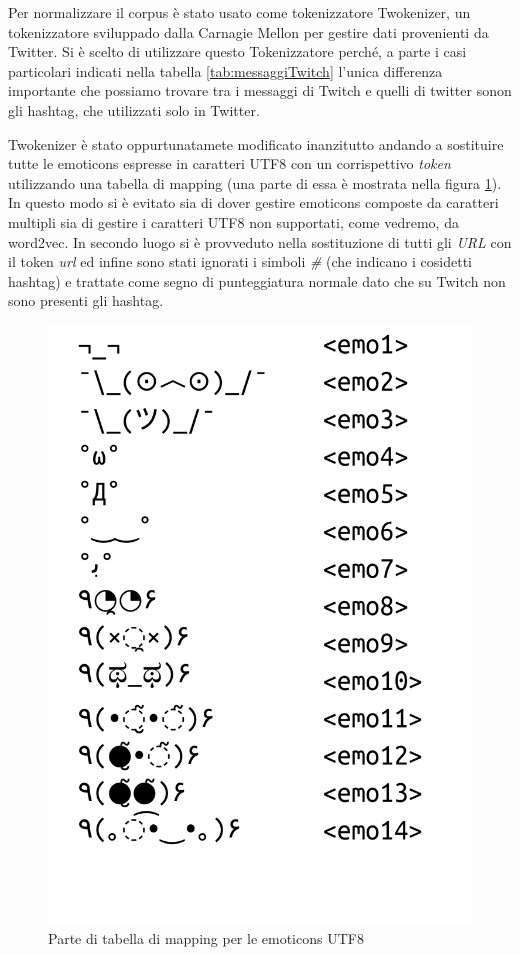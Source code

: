 \documentclass[a4paper,12pt,openright,twoside]{report}
\theoremstyle{definition}
\begin{document}
Per normalizzare il corpus è stato usato come tokenizzatore Twokenizer, un tokenizzatore sviluppado dalla Carnagie Mellon per gestire dati provenienti da Twitter. 
Si è scelto di utilizzare questo Tokenizzatore perché, a parte i casi particolari indicati nella tabella
\ref{tab:messaggiTwitch} l'unica differenza importante che possiamo trovare tra i messaggi di Twitch e
quelli di twitter sonon gli
hashtag, che utilizzati solo in Twitter. 

Twokenizer è stato oppurtunatamete
modificato inanzitutto andando a sostituire tutte le emoticons espresse in caratteri UTF8 con un corrispettivo \emph{token}
utilizzando una tabella di mapping (una parte di essa è mostrata nella figura \ref{fig:mappingEmo}). In
questo modo si è evitato sia di dover gestire emoticons composte da caratteri multipli sia di gestire
i caratteri UTF8 non supportati, come vedremo, da word2vec.
In secondo luogo si è provveduto nella sostituzione di tutti gli \emph{URL} con il token \emph{url} ed infine
sono stati ignorati i simboli \emph{\#} (che indicano i cosidetti hashtag) e trattate come segno di punteggiatura normale dato che su Twitch non
sono presenti gli hashtag.

\begin{figure}[ht]
	\centering
	\includegraphics[scale=0.3]{Immagini/emoticonsTable.pdf}
	\caption{Parte di tabella di mapping per le emoticons UTF8}
	\label{fig:mappingEmo}
\end{figure}
\end{document}
